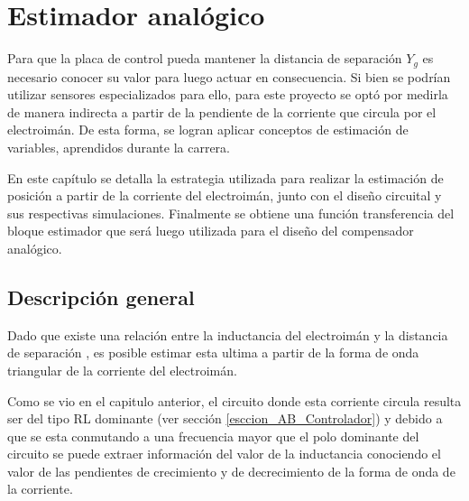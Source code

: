 \chapter{Estimador analógico}  \label{cap:Estimador Analogico}


 Para que la placa de control pueda mantener la distancia de separación $Y_{g}$ es necesario conocer su valor  para luego actuar en consecuencia. Si bien se podrían utilizar sensores  especializados para ello, para este proyecto se optó por medirla de manera indirecta a partir de la pendiente de la corriente que circula por el electroimán. De esta forma, se logran aplicar conceptos de estimación de variables, aprendidos durante la carrera. 
 
 En este capítulo se detalla la estrategia utilizada para realizar la estimación de posición a partir de la corriente del electroimán, junto con el diseño circuital y sus respectivas simulaciones. Finalmente se obtiene una función transferencia del bloque estimador que será luego utilizada para el diseño del compensador analógico.

\section{Descripción general}


Dado que existe una relación entre la inductancia del electroimán y la distancia de separación , es posible estimar esta ultima a partir de la forma de onda triangular de la corriente del electroimán. 

Como se vio en el capitulo anterior, el circuito donde esta corriente circula resulta ser del tipo RL dominante (ver sección \ref{esccion_AB_Controlador}) y debido a que se esta conmutando a una frecuencia mayor que el polo dominante del circuito se puede extraer información del valor de la inductancia conociendo el valor de las pendientes de crecimiento y de decrecimiento de la forma de onda de la corriente.


